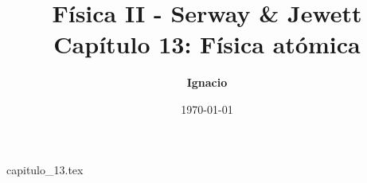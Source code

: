 \documentclass[11pt,spanish,oneside]{report}
\title{\textbf{Física II - Serway \& Jewett} \\ \Large Capítulo 13: Física atómica}
\author{\textbf{Ignacio}}
\date{\today}
\begin{document}
\maketitle

{capitulo_13.tex}
\end{document}
